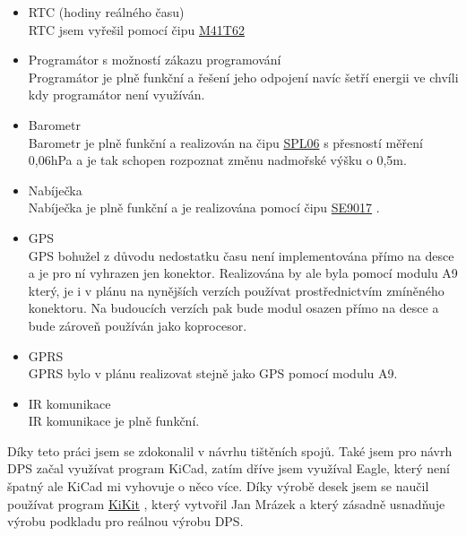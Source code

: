 \begin{itemize}
    \item RTC (hodiny reálného času) \\ RTC jsem vyřešil pomocí čipu \href{https://datasheet.lcsc.com/szlcsc/STMicroelectronics-M41T62Q6F_C113207.pdf}{M41T62} \parencite{m41t62} 
    \item Programátor s možností zákazu programování \\ Programátor je plně funkční a řešení jeho odpojení navíc šetří energii ve chvíli kdy programátor není využíván.
    \item Barometr \\ Barometr je plně funkční a realizován na čipu \href{https://datasheet.lcsc.com/szlcsc/1907081118_Goertek-SPL06-007_C233787.pdf}{SPL06} s přesností měření 
            0,06hPa a je tak schopen rozpoznat změnu nadmořské výšku o 0,5m.
    \item Nabíječka \\ Nabíječka je plně funkční a je realizována pomocí čipu \href{https://datasheet.lcsc.com/szlcsc/Seaward-Elec-SE9017-HF_C115752.pdf}{SE9017} \parencite{se9017}.
    \item GPS \\ GPS bohužel z důvodu nedostatku času není implementována přímo na desce a je pro ní vyhrazen jen konektor. Realizována by ale byla pomocí modulu A9 který, 
            je i v plánu na nynějších verzích používat prostřednictvím zmíněného konektoru. Na budoucích verzích pak bude modul osazen přímo na desce a bude zároveň používán jako koprocesor.
    \item GPRS \\ GPRS bylo v plánu realizovat stejně jako GPS pomocí modulu A9.
    \item IR komunikace \\ IR komunikace je plně funkční.
\end{itemize}



Díky teto práci jsem se zdokonalil v návrhu tištěních spojů. Také jsem pro návrh DPS začal využívat program KiCad, zatím dříve jsem využíval Eagle, který není špatný ale KiCad 
mi vyhovuje o něco více. Díky výrobě desek jsem se naučil používat program \href{https://github.com/yaqwsx/KiKit}{KiKit} \parencite{KiKit}, 
který vytvořil Jan Mrázek a který zásadně usnadňuje výrobu podkladu pro reálnou výrobu DPS.



